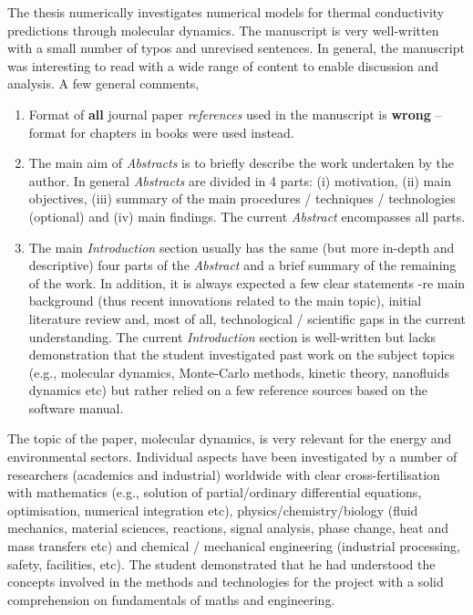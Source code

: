 \documentclass[14pt,twoside]{report}
\begin{document}
The thesis numerically investigates numerical models for thermal conductivity predictions through molecular dynamics. The manuscript is very well-written with a small number of typos and unrevised sentences. In general, the manuscript was interesting to read with a wide range of content to enable discussion and analysis. A few general comments,
\begin{enumerate}
%
\item Format of {\bf all} journal paper {\it references} used in the manuscript is {\bf wrong} -- format for chapters in books were used instead. 
%
\item The main aim of {\it Abstracts} is to briefly describe the work undertaken by the author. In general {\it Abstracts} are divided in 4 parts: (i) motivation, (ii) main objectives, (iii) summary of the main procedures / techniques / technologies (optional) and (iv) main findings. The current {\it Abstract} encompasses all parts.
%
\item The main {\it Introduction} section usually has the same (but more in-depth and descriptive) four parts of the {\it Abstract} and a brief summary of the remaining of the work. In addition, it is always expected a few clear statements -re main background (thus recent innovations related to the main topic), initial literature review and, most of all, technological / scientific gaps in the current understanding. The current {\it Introduction} section is well-written but lacks demonstration that the student investigated past work on the subject topics (e.g., molecular dynamics, Monte-Carlo methods, kinetic theory, nanofluids dynamics etc) but rather relied on a few reference sources based on the software manual.
%
\end{enumerate}

The topic of the paper, molecular dynamics, is very relevant for the energy and environmental sectors. Individual aspects have been investigated by a number of researchers (academics and industrial) worldwide with clear cross-fertilisation with mathematics (e.g., solution of partial/ordinary differential equations, optimisation, numerical integration etc), physics/chemistry/biology (fluid mechanics, material sciences, reactions, signal analysis, phase change, heat and mass transfers etc) and chemical / mechanical engineering (industrial processing, safety, facilities, etc). The student demonstrated that he had understood the concepts involved in the methods and technologies for the project with a solid comprehension on fundamentals of maths and engineering.    
\end{document}
